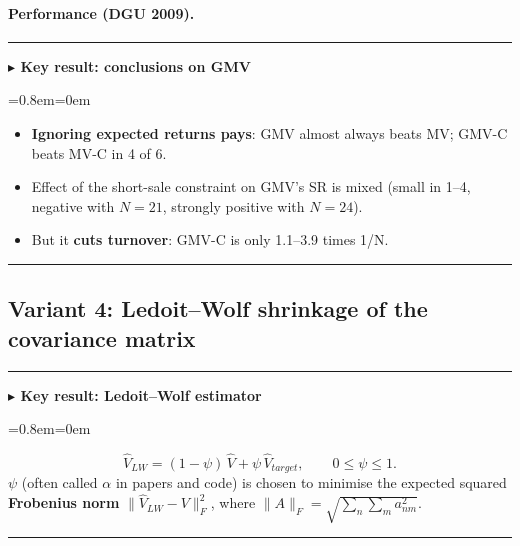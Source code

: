 \documentclass[11pt,a4paper]{report}
\newenvironment{notebox}[1]
  {\par\medskip\Needspace{6\baselineskip}\noindent\rule{\linewidth}{0.4pt}\par\nopagebreak
   \noindent\textbf{#1}\par\nopagebreak
   \begin{list}{}{\leftmargin=0.8em\rightmargin=0em\topsep=2pt}\item[]}
  {\end{list}\nopagebreak\noindent\rule{\linewidth}{0.4pt}\par\medskip}
\newenvironment{keybox}[1][]{\begin{notebox}{$\blacktriangleright$ Key result#1}}{\end{notebox}}
\begin{document}
\paragraph{Performance (DGU 2009).}
\begin{center}\small
{}
\end{center}
\begin{keybox}[: conclusions on GMV]
\begin{itemize}
  \item \textbf{Ignoring expected returns pays}: GMV almost always beats MV; GMV-C beats MV-C in 4 of 6.
  \item Effect of the short-sale constraint on GMV's SR is mixed (small in 1--4,
    negative with $N=21$, strongly positive with $N=24$).
  \item But it \textbf{cuts turnover}: GMV-C is only 1.1--3.9 times 1/N.
\end{itemize}
\end{keybox}

\subsection{Variant 4: Ledoit--Wolf shrinkage of the covariance matrix}
\begin{keybox}[: Ledoit--Wolf estimator]
\[
\hat V_{LW}=(1-\psi)\,\hat V+\psi\,\hat V_{target},\qquad 0\le\psi\le1 .
\]
$\psi$ (often called $\alpha$ in papers and code) is chosen to minimise the expected
squared \textbf{Frobenius norm} $\|\hat V_{LW}-V\|_F^2$, where
$\|A\|_F=\sqrt{\sum_n\sum_m a_{nm}^2}$.
\end{keybox}
\end{document}
